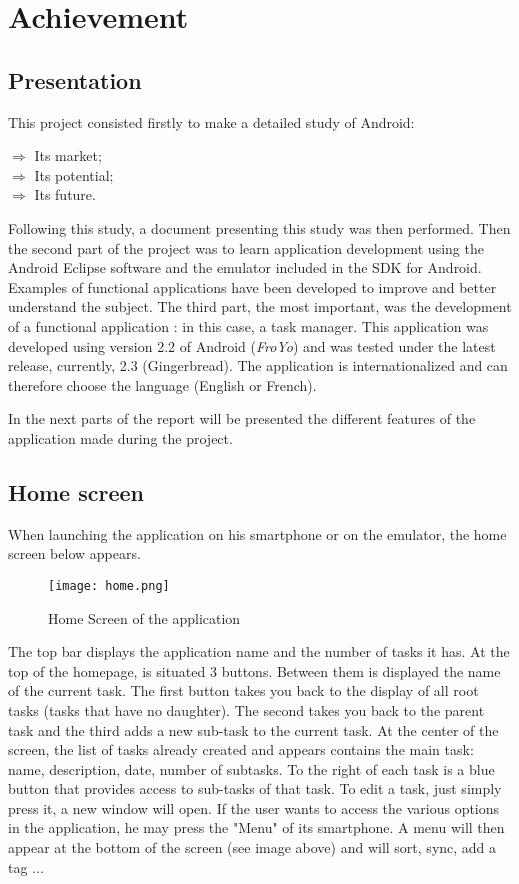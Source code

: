 \chapter{Achievement}

\section{Presentation}

This project consisted firstly to make a detailed study of Android:
\begin{description}
    \item[$\Rightarrow$ Its market;]
    \item[$\Rightarrow$ Its potential;]
    \item[$\Rightarrow$ Its future.]
\end{description}

\noindent Following this study, a document presenting this study was then performed.
Then the second part of the project was to learn application development using the Android Eclipse software and the emulator included in the SDK for Android.
Examples of functional applications have been developed to improve and better understand the subject.
The third part, the most important, was the development of a functional application : in this case, a task manager. This application was developed using version 2.2 of Android (\textit{FroYo}) and was tested under the latest release, currently, 2.3 (Gingerbread). The application is internationalized and can therefore choose the language (English or French).

\noindent In the next parts of the report will be presented the different features of the application made during the project.

\section{Home screen}

When launching the application on his smartphone or on the emulator, the home screen below appears.

\begin{figure}[!ht]
    \centering
    \texttt{[image: home.png]}
    \caption{Home Screen of the application}
\end{figure}

\noindent The top bar displays the application name and the number of tasks it has.
At the top of the homepage, is situated 3 buttons. Between them is displayed the name of the current task. The first button takes you back to the display of all root tasks (tasks that have no daughter). The second takes you back to the parent task and the third adds a new sub-task to the current task.
At the center of the screen, the list of tasks already created and appears contains the main task: name, description, date, number of subtasks. To the right of each task is a blue button that provides access to sub-tasks of that task. To edit a task, just simply press it, a new window will open.
If the user wants to access the various options in the application, he may press the "Menu" of its smartphone. A menu will then appear at the bottom of the screen (see image above) and will sort, sync, add a tag ...

